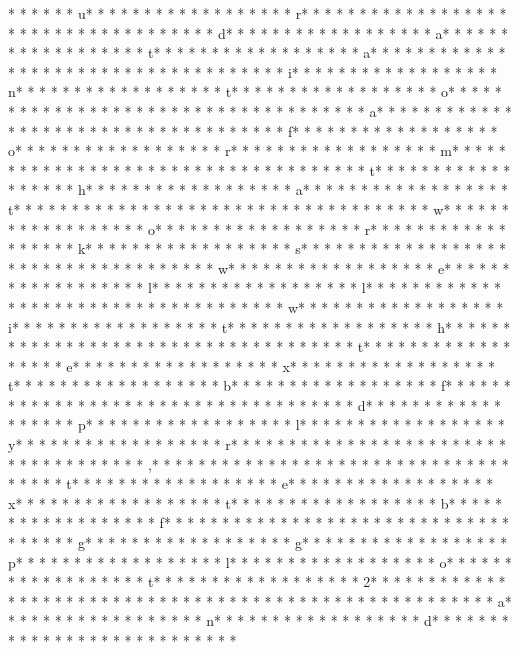 *  *  * * *  * u* * *  * * *  * * *  *  * * *  *  * * *  * r* * *  * * *  * * *  *  * * *  *  * * *  *  * * *  * * *  * * *  *  * * *  *  * * *  * d* * *  * * *  * * *  *  * * *  *  * * *  * a* * *  * * *  * * *  *  * * *  *  * * *  * t* * *  * * *  * * *  *  * * *  *  * * *  * a* * *  * * *  * * *  *  * * *  *  * * *  *  * * *  * * *  * * *  *  * * *  *  * * *  * i* * *  * * *  * * *  *  * * *  *  * * *  * n* * *  * * *  * * *  *  * * *  *  * * *  * t* * *  * * *  * * *  *  * * *  *  * * *  * o* * *  * * *  * * *  *  * * *  *  * * *  *  * * *  * * *  * * *  *  * * *  *  * * *  * a* * *  * * *  * * *  *  * * *  *  * * *  *  * * *  * * *  * * *  *  * * *  *  * * *  * f* * *  * * *  * * *  *  * * *  *  * * *  * o* * *  * * *  * * *  *  * * *  *  * * *  * r* * *  * * *  * * *  *  * * *  *  * * *  * m* * *  * * *  * * *  *  * * *  *  * * *  *  * * *  * * *  * * *  *  * * *  *  * * *  * t* * *  * * *  * * *  *  * * *  *  * * *  * h* * *  * * *  * * *  *  * * *  *  * * *  * a* * *  * * *  * * *  *  * * *  *  * * *  * t* * *  * * *  * * *  *  * * *  *  * * *  *  * * *  * * *  * * *  *  * * *  *  * * *  * w* * *  * * *  * * *  *  * * *  *  * * *  * o* * *  * * *  * * *  *  * * *  *  * * *  * r* * *  * * *  * * *  *  * * *  *  * * *  * k* * *  * * *  * * *  *  * * *  *  * * *  * s* * *  * * *  * * *  *  * * *  *  * * *  *  * * *  * * *  * * *  *  * * *  *  * * *  * w* * *  * * *  * * *  *  * * *  *  * * *  * e* * *  * * *  * * *  *  * * *  *  * * *  * l* * *  * * *  * * *  *  * * *  *  * * *  * l* * *  * * *  * * *  *  * * *  *  * * *  *  * * *  * * *  * * *  *  * * *  *  * * *  * w* * *  * * *  * * *  *  * * *  *  * * *  * i* * *  * * *  * * *  *  * * *  *  * * *  * t* * *  * * *  * * *  *  * * *  *  * * *  * h* * *  * * *  * * *  *  * * *  *  * * *  *  * * *  * * *  * * *  *  * * *  *  * * *  * t* * *  * * *  * * *  *  * * *  *  * * *  * e* * *  * * *  * * *  *  * * *  *  * * *  * x* * *  * * *  * * *  *  * * *  *  * * *  * t* * *  * * *  * * *  *  * * *  *  * * *  * b* * *  * * *  * * *  *  * * *  *  * * *  * f* * *  * * *  * * *  *  * * *  *  * * *  * {* * *  * * *  * * *  *  * * *  *  * * *  * d* * *  * * *  * * *  *  * * *  *  * * *  * p* * *  * * *  * * *  *  * * *  *  * * *  * l* * *  * * *  * * *  *  * * *  *  * * *  * y* * *  * * *  * * *  *  * * *  *  * * *  * r* * *  * * *  * * *  *  * * *  *  * * *  * }* * *  * * *  * * *  *  * * *  *  * * *  * ,* * *  * * *  * * *  *  * * *  *  * * *  *  * * *  * * *  * * *  *  * * *  *  * * *  * t* * *  * * *  * * *  *  * * *  *  * * *  * e* * *  * * *  * * *  *  * * *  *  * * *  * x* * *  * * *  * * *  *  * * *  *  * * *  * t* * *  * * *  * * *  *  * * *  *  * * *  * b* * *  * * *  * * *  *  * * *  *  * * *  * f* * *  * * *  * * *  *  * * *  *  * * *  * {* * *  * * *  * * *  *  * * *  *  * * *  * g* * *  * * *  * * *  *  * * *  *  * * *  * g* * *  * * *  * * *  *  * * *  *  * * *  * p* * *  * * *  * * *  *  * * *  *  * * *  * l* * *  * * *  * * *  *  * * *  *  * * *  * o* * *  * * *  * * *  *  * * *  *  * * *  * t* * *  * * *  * * *  *  * * *  *  * * *  * 2* * *  * * *  * * *  *  * * *  *  * * *  * }* * *  * * *  * * *  *  * * *  *  * * *  *  * * *  * * *  * * *  *  * * *  *  * * *  * a* * *  * * *  * * *  *  * * *  *  * * *  * n* * *  * * *  * * *  *  * * *  *  * * *  * d* * *  * * *  * * *  *  * * *  *  * * *  *  * * *  * * *  * * * 